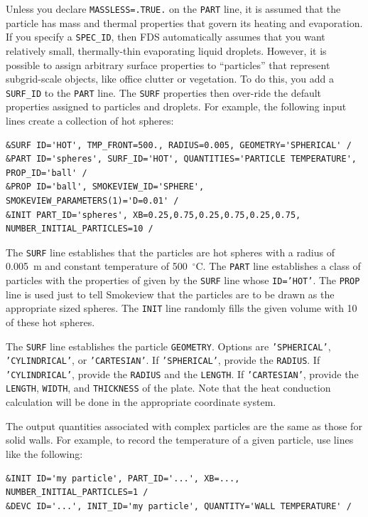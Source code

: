 \documentclass[11pt]{book}
\newcommand{\ct}{\tt\small}
\begin{document}
Unless you declare {\ct MASSLESS=.TRUE.} on the {\ct PART} line, it is assumed that the particle has mass and thermal properties that govern its
heating and evaporation. If you specify a {\ct SPEC\_ID}, then FDS automatically assumes that you want relatively small, thermally-thin evaporating liquid droplets.
However, it is possible to assign arbitrary surface properties to
``particles'' that represent subgrid-scale objects, like office clutter or vegetation. To do this, you add a {\ct SURF\_ID} to the {\ct PART} line. The
{\ct SURF} properties then over-ride the default properties assigned to particles and droplets. For example, the following input lines create a collection
of hot spheres:

\footnotesize
\begin{verbatim}
&SURF ID='HOT', TMP_FRONT=500., RADIUS=0.005, GEOMETRY='SPHERICAL' /
&PART ID='spheres', SURF_ID='HOT', QUANTITIES='PARTICLE TEMPERATURE', PROP_ID='ball' /
&PROP ID='ball', SMOKEVIEW_ID='SPHERE', SMOKEVIEW_PARAMETERS(1)='D=0.01' /
&INIT PART_ID='spheres', XB=0.25,0.75,0.25,0.75,0.25,0.75, NUMBER_INITIAL_PARTICLES=10 /
\end{verbatim}
\normalsize

\noindent
The {\ct SURF} line establishes that the particles are hot spheres with a radius of 0.005~m and constant temperature of 500~$^\circ$C. The {\ct PART}
line establishes a class of particles with the properties of given by the {\ct SURF} line whose {\ct ID='HOT'}. The {\ct PROP} line is used just
to tell Smokeview that the particles are to be drawn as the appropriate sized spheres. The {\ct INIT} line randomly fills the given volume with
10 of these hot spheres.

The {\ct SURF} line establishes the particle {\ct GEOMETRY}. Options are {\ct 'SPHERICAL'}, {\ct 'CYLINDRICAL'}, or {\ct 'CARTESIAN'}. If
{\ct 'SPHERICAL'}, provide the {\ct RADIUS}. If {\ct 'CYLINDRICAL'}, provide the {\ct RADIUS} and the {\ct LENGTH}. If {\ct 'CARTESIAN'}, provide
the {\ct LENGTH}, {\ct WIDTH}, and {\ct THICKNESS} of the plate. Note that the heat conduction calculation will be done in the appropriate coordinate
system.

The output quantities associated with complex particles are the same as those for solid walls. For example, to record the temperature of a given
particle, use lines like the following:

\footnotesize
\begin{verbatim}
&INIT ID='my particle', PART_ID='...', XB=..., NUMBER_INITIAL_PARTICLES=1 /
&DEVC ID='...', INIT_ID='my particle', QUANTITY='WALL TEMPERATURE' /
\end{verbatim}
\normalsize
\end{document}
